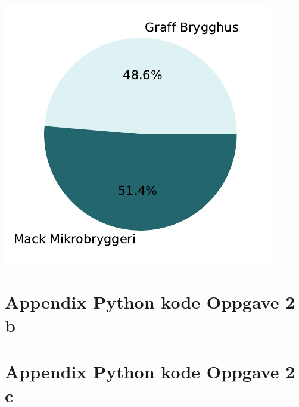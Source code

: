 \documentclass[
  12pt,
  a4paper,
  DIV=11,
  numbers=noendperiod]{scrartcl}
\begin{document}
\includegraphics{18_SOK2030_mappeoppgave_2_V24_files/figure-pdf/cell-36-output-1.pdf}

\clearpage

\section {Appendix Python kode Oppgave 2 b}

\clearpage

\section {Appendix Python kode Oppgave 2 c}
\end{document}
